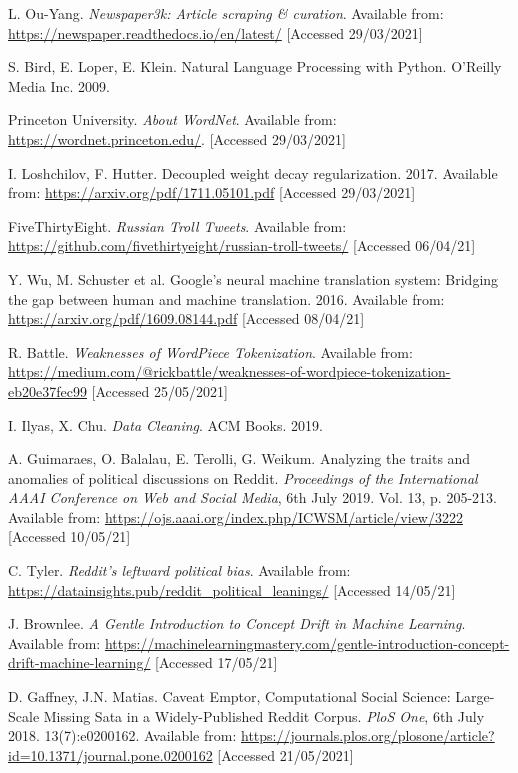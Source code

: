 \begin{thebibliography}{9}
L. Ou-Yang. \textit{Newspaper3k: Article scraping \& curation}. Available from: \url{https://newspaper.readthedocs.io/en/latest/} [Accessed 29/03/2021]

S. Bird, E. Loper, E. Klein. Natural Language Processing with Python. O’Reilly Media Inc. 2009.

Princeton University. \textit{About WordNet}. Available from: \url{https://wordnet.princeton.edu/}. [Accessed 29/03/2021]

I. Loshchilov, F. Hutter. Decoupled weight decay regularization. 2017. Available from: \url{https://arxiv.org/pdf/1711.05101.pdf} [Accessed 29/03/2021]

FiveThirtyEight. \textit{Russian Troll Tweets}. Available from: \url{https://github.com/fivethirtyeight/russian-troll-tweets/} [Accessed 06/04/21]

Y. Wu, M. Schuster et al. Google's neural machine translation system: Bridging the gap between human and machine translation. 2016. Available from: \url{https://arxiv.org/pdf/1609.08144.pdf} [Accessed 08/04/21]

R. Battle. \textit{Weaknesses of WordPiece Tokenization}. Available from: \url{https://medium.com/@rickbattle/weaknesses-of-wordpiece-tokenization-eb20e37fec99} [Accessed 25/05/2021]

I. Ilyas, X. Chu. \textit{Data Cleaning}. ACM Books. 2019.

A. Guimaraes, O. Balalau, E. Terolli, G. Weikum. Analyzing the traits and anomalies of political discussions on Reddit. \textit{Proceedings of the International AAAI Conference on Web and Social Media}, 6th July 2019. Vol. 13, p. 205-213. Available from: \url{https://ojs.aaai.org/index.php/ICWSM/article/view/3222} [Accessed 10/05/21]

C. Tyler. \textit{Reddit's leftward political bias}. Available from: \url{https://datainsights.pub/reddit_political_leanings/} [Accessed 14/05/21]

J. Brownlee. \textit{A Gentle Introduction to Concept Drift in Machine Learning}. Available from: \url{https://machinelearningmastery.com/gentle-introduction-concept-drift-machine-learning/} [Accessed 17/05/21]

D. Gaffney, J.N. Matias. Caveat Emptor, Computational Social Science: Large-Scale Missing Sata in a Widely-Published Reddit Corpus. \textit{PloS One}, 6th July 2018. 13(7):e0200162. Available from: \url{https://journals.plos.org/plosone/article?id=10.1371/journal.pone.0200162} [Accessed 21/05/2021]


\end{thebibliography}
